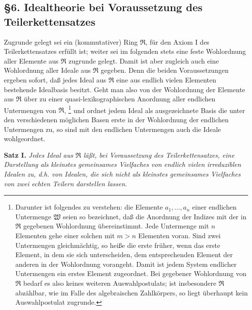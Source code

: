 \documentclass[11pt]{article}
\providecommand{\mR}{\mathfrak{R}}
\begin{document}
\setcounter{footnote}{25}

\subsection*{§6. Idealtheorie bei Voraussetzung des Teilerkettensatzes}

Zugrunde gelegt sei ein (kommutativer) Ring $\mR$, für den Axiom I des Teilerkettensatzes erfüllt ist; weiter sei im folgenden stets eine feste Wohlordnung aller Elemente aus $\mR$ zugrunde gelegt. Damit ist aber zugleich auch eine Wohlordnung aller Ideale aus $\mR$ gegeben. Denn die beiden Voraussetzungen ergeben sofort, daß jedes Ideal aus $\mR$ eine aus endlich vielen Elementen bestehende Idealbasis besitzt. Geht man also von der Wohlordnung der Elemente aus $\mR$ über zu einer quasi-lexikographischen Anordnung aller endlichen Untermengen von $\mR$,
\footnote{Darunter ist folgendes zu verstehen: die Elemente $a_1,\ldots,a_n$ einer endlichen Untermenge $\mathfrak W$ seien so bezeichnet, daß die Anordnung der Indizes mit der in $\mR$ gegebenen Wohlordnung übereinstimmt. Jede Untermenge mit $n$ Elementen gehe einer solchen mit $m>n$ Elementen voran. Sind zwei Untermengen gleichmächtig, so heiße die erste früher, wenn das erste Element, in dem sie sich unterscheiden, dem entsprechenden Element der anderen in der Wohlordnung vorangeht. Damit ist jedem System endlicher Untermengen ein erstes Element zugeordnet. Bei gegebener Wohlordnung von $\mR$ bedarf es also keines weiteren Auswahlpostulats; ist insbesondere $\mR$ abzählbar, wie im Falle des algebraischen Zahlkörpers, so liegt überhaupt kein Auswahlpostulat zugrunde.}
und ordnet jedem Ideal als ausgezeichnete Basis die unter den verschiedenen möglichen Basen erste in der Wohlordnung der endlichen Untermengen zu, so sind mit den endlichen Untermengen auch die Ideale wohlgeordnet.

\textbf{Satz I.} \emph{Jedes Ideal aus $\mR$ läßt, bei Voraussetzung des Teilerkettensatzes, eine Darstellung als kleinstes gemeinsames Vielfaches von endlich vielen irreduziblen Idealen zu, d.h. von Idealen, die sich nicht als kleinstes gemeinsames Vielfaches von zwei echten Teilern darstellen lassen.}
\end{document}
